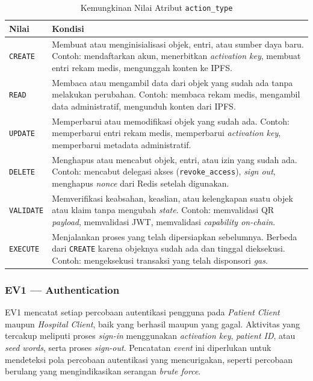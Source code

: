 \begin{table}[htbp]
\centering
\caption{Kemungkinan Nilai Atribut \texttt{action\_type}}
\label{tab:nilai-action-type}
\renewcommand{\arraystretch}{1.3}
\begin{tabular}{|p{2.5cm}|p{9.5cm}|}
\hline
\textbf{Nilai} & \textbf{Kondisi} \\
\hline
\texttt{CREATE} &
Membuat atau menginisialisasi objek, entri, atau sumber daya baru.
Contoh: mendaftarkan akun, menerbitkan \textit{activation key}, membuat
entri rekam medis, mengunggah konten ke IPFS. \\
\hline
\texttt{READ} &
Membaca atau mengambil data dari objek yang sudah ada tanpa melakukan
perubahan. Contoh: membaca rekam medis, mengambil data administratif,
mengunduh konten dari IPFS. \\
\hline
\texttt{UPDATE} &
Memperbarui atau memodifikasi objek yang sudah ada. Contoh: memperbarui
entri rekam medis, memperbarui \textit{activation key}, memperbarui
metadata administratif. \\
\hline
\texttt{DELETE} &
Menghapus atau mencabut objek, entri, atau izin yang sudah ada. Contoh:
mencabut delegasi akses (\texttt{revoke\_access}), \textit{sign out},
menghapus \textit{nonce} dari Redis setelah digunakan. \\
\hline
\texttt{VALIDATE} &
Memverifikasi keabsahan, keaslian, atau kelengkapan suatu objek atau
klaim tanpa mengubah \textit{state}. Contoh: memvalidasi QR \textit{payload},
memvalidasi JWT, memvalidasi \textit{capability on-chain}. \\
\hline
\texttt{EXECUTE} &
Menjalankan proses yang telah dipersiapkan sebelumnya. Berbeda dari
\texttt{CREATE} karena objeknya sudah ada dan tinggal dieksekusi. Contoh:
mengeksekusi transaksi yang telah disponsori \textit{gas}. \\
\hline
\end{tabular}
\end{table}

\subsubsection{EV1 --- Authentication}
\label{subsec:ev1-authentication}

EV1 mencatat setiap percobaan autentikasi pengguna pada \textit{Patient Client}
maupun \textit{Hospital Client}, baik yang berhasil maupun yang gagal. Aktivitas
yang tercakup meliputi proses \textit{sign-in} menggunakan \textit{activation key},
\textit{patient ID}, atau \textit{seed words}, serta proses \textit{sign-out}.
Pencatatan \textit{event} ini diperlukan untuk mendeteksi pola percobaan autentikasi
yang mencurigakan, seperti percobaan berulang yang mengindikasikan serangan
\textit{brute force}.

